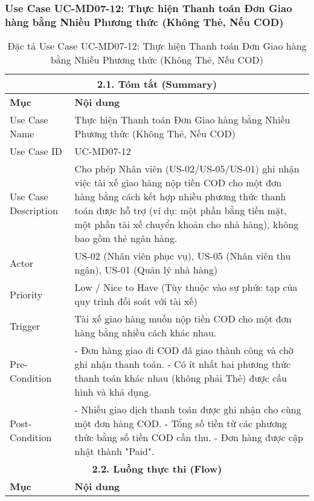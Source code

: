 \subsubsection{Use Case UC-MD07-12: Thực hiện Thanh toán Đơn Giao hàng bằng Nhiều Phương thức (Không Thẻ, Nếu COD)}
\begin{longtable}{|m{4cm}|p{11cm}|}
\caption{Đặc tả Use Case UC-MD07-12: Thực hiện Thanh toán Đơn Giao hàng bằng Nhiều Phương thức (Không Thẻ, Nếu COD)} \label{tab:uc_md07_12_final_full} \\
\hline
\multicolumn{2}{|c|}{\textbf{2.1. Tóm tắt (Summary)}} \\
\hline
\textbf{Mục} & \textbf{Nội dung} \\
\hline
\endhead %
\hline
\endfoot %
\hline
\endlastfoot %
Use Case Name & Thực hiện Thanh toán Đơn Giao hàng bằng Nhiều Phương thức (Không Thẻ, Nếu COD) \\
\hline
Use Case ID & UC-MD07-12 \\
\hline
Use Case Description & Cho phép Nhân viên (US-02/US-05/US-01) ghi nhận việc tài xế giao hàng nộp tiền COD cho một đơn hàng bằng cách kết hợp nhiều phương thức thanh toán được hỗ trợ (ví dụ: một phần bằng tiền mặt, một phần tài xế chuyển khoản cho nhà hàng), không bao gồm thẻ ngân hàng. \\
\hline
Actor & US-02 (Nhân viên phục vụ), US-05 (Nhân viên thu ngân), US-01 (Quản lý nhà hàng) \\
\hline
Priority & Low / Nice to Have (Tùy thuộc vào sự phức tạp của quy trình đối soát với tài xế) \\
\hline
Trigger & Tài xế giao hàng muốn nộp tiền COD cho một đơn hàng bằng nhiều cách khác nhau. \\
\hline
Pre-Condition & - Đơn hàng giao đi COD đã giao thành công và chờ ghi nhận thanh toán. \newline - Có ít nhất hai phương thức thanh toán khác nhau (không phải Thẻ) được cấu hình và khả dụng. \\
\hline
Post-Condition & - Nhiều giao dịch thanh toán được ghi nhận cho cùng một đơn hàng COD. \newline - Tổng số tiền từ các phương thức bằng số tiền COD cần thu. \newline - Đơn hàng được cập nhật thành "Paid". \\
\hline
\multicolumn{2}{|c|}{\textbf{2.2. Luồng thực thi (Flow)}} \\
\hline
\textbf{Mục} & \textbf{Nội dung} \\

\end{longtable}
